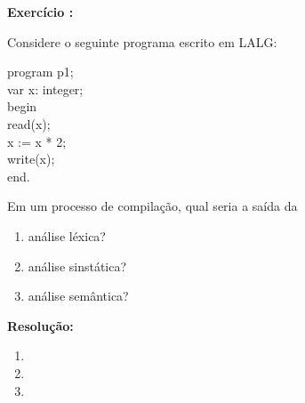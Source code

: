 

\setcounter{count}{0}
\renewcommand{\labelenumi}{\alph{enumi}.}
\newcommand{\exercise}[2]{%
  \stepcounter{count}%
  \noindent\textbf{Exercício \thecount:}

  #1
  
  \vspace{\baselineskip}%
  \noindent\textbf{Resolução:}%
  \vspace{\baselineskip}%
  
  #2 
  
  \vspace{2\baselineskip}%
}


\maketitle

\exercise{
	Considere o seguinte programa escrito em LALG:

	program p1;\\
	var x: integer;\\
	begin\\
	\hspace*{2em} read(x);\\
	\hspace*{2em} x := x * 2;\\
	\hspace*{2em} write(x);\\
	end.

	Em um processo de compilação, qual seria a saída da

	\begin{enumerate}
		\item análise léxica?
		\item análise sinstática?
		\item análise semântica?
	\end{enumerate}
} {
	\begin{enumerate}
		\item
		\item
		\item
	\end{enumerate}
}

